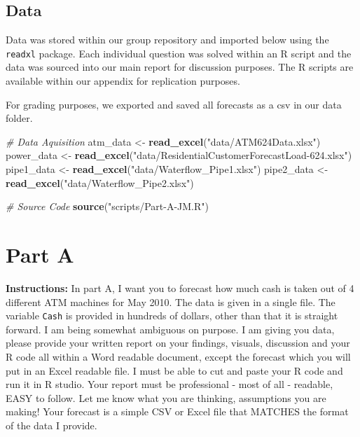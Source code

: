 \documentclass[openany]{book}
\newenvironment{Shaded}{\begin{snugshade}}{\end{snugshade}}
\newcommand{\CommentTok}[1]{\textcolor[rgb]{0.56,0.35,0.01}{\textit{#1}}}
\newcommand{\KeywordTok}[1]{\textcolor[rgb]{0.13,0.29,0.53}{\textbf{#1}}}
\newcommand{\NormalTok}[1]{#1}
\newcommand{\StringTok}[1]{\textcolor[rgb]{0.31,0.60,0.02}{#1}}
\renewenvironment{quote}{\begin{myquote}}{\end{myquote}}
\begin{document}
\hypertarget{data}{%
\section*{Data}\label{data}}

Data was stored within our group repository and imported below using the
\texttt{readxl} package. Each individual question was solved within an R
script and the data was sourced into our main report for discussion
purposes. The R scripts are available within our appendix for
replication purposes.

For grading purposes, we exported and saved all forecasts as a csv in
our data folder.

\begin{Shaded}
\begin{Highlighting}[]
\CommentTok{# Data Aquisition}
\NormalTok{atm_data <-}\StringTok{ }\KeywordTok{read_excel}\NormalTok{(}\StringTok{"data/ATM624Data.xlsx"}\NormalTok{) }
\NormalTok{power_data <-}\StringTok{ }\KeywordTok{read_excel}\NormalTok{(}\StringTok{"data/ResidentialCustomerForecastLoad-624.xlsx"}\NormalTok{) }
\NormalTok{pipe1_data <-}\StringTok{ }\KeywordTok{read_excel}\NormalTok{(}\StringTok{"data/Waterflow_Pipe1.xlsx"}\NormalTok{)}
\NormalTok{pipe2_data <-}\StringTok{ }\KeywordTok{read_excel}\NormalTok{(}\StringTok{"data/Waterflow_Pipe2.xlsx"}\NormalTok{)}

\CommentTok{# Source Code}
\KeywordTok{source}\NormalTok{(}\StringTok{"scripts/Part-A-JM.R"}\NormalTok{)}
\end{Highlighting}
\end{Shaded}

\hypertarget{part-a}{%
\chapter{Part A}\label{part-a}}

\begin{quote}
\textbf{Instructions:} In part A, I want you to forecast how much cash
is taken out of 4 different ATM machines for May 2010. The data is given
in a single file. The variable \texttt{Cash} is provided in hundreds of
dollars, other than that it is straight forward. I am being somewhat
ambiguous on purpose. I am giving you data, please provide your written
report on your findings, visuals, discussion and your R code all within
a Word readable document, except the forecast which you will put in an
Excel readable file. I must be able to cut and paste your R code and run
it in R studio. Your report must be professional - most of all -
readable, EASY to follow. Let me know what you are thinking, assumptions
you are making! Your forecast is a simple CSV or Excel file that MATCHES
the format of the data I provide.
\end{quote}
\end{document}
